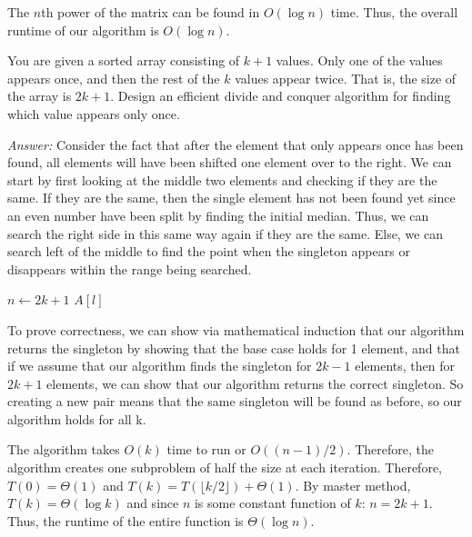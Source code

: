\documentclass[12pt]{article}
\newenvironment{problem}[2][Problem]{\begin{trivlist}
\item[\hskip \labelsep {\bfseries #1}\hskip \labelsep {\bfseries #2.}]}{\end{trivlist}}
\begin{document}
The $n$th power of the matrix can be found in $O(\log n)$ time. Thus, the overall runtime of our algorithm is $O(\log n)$.
\begin{problem}{5}
    You are given a sorted array consisting of $k+1$ values. Only one of the values appears once, and then the rest of the $k$ values appear twice. That is, the size of the array is $2k+1$. Design an efficient divide and conquer algorithm for finding which value appears only once.
\end{problem}
\textit{Answer:} Consider the fact that after the element that only appears once has been found, all elements will have been shifted one element over to the right. We can start by first looking at the middle two elements and checking if they are the same. If they are the same, then the single element has not been found yet since an even number have been split by finding the initial median. Thus, we can search the right side in this same way again if they are the same. Else, we can search left of the middle to find the point when the singleton appears or disappears within the range being searched. 
\begin{algorithmic}
    \State $n\gets 2k+1$
        \Return $A[l]$
        \EndIf
        \Else {}
        \EndIf
    \EndProcedure
\end{algorithmic}

To prove correctness, we can show via mathematical induction that our algorithm returns the singleton by showing that the base case holds for 1 element, and that if we assume that our algorithm finds the singleton for $2k-1$ elements, then for $2k+1$ elements, we can show that our algorithm returns the correct singleton. So creating a new pair means that the same singleton will be found as before, so our algorithm holds for all k.

The algorithm takes $O(k)$ time to run or $O((n-1)/2)$. Therefore, the algorithm creates one subproblem of half the size at each iteration. Therefore, $T(0)=\Theta(1)$ and $T(k)=T(\lfloor k/2 \rfloor)+\Theta(1)$. By master method, $T(k) = \Theta(\log k)$ and since $n$ is some constant function of $k$: $n=2k+1$. Thus, the runtime of the entire function is $\Theta(\log n)$.
\end{document}
